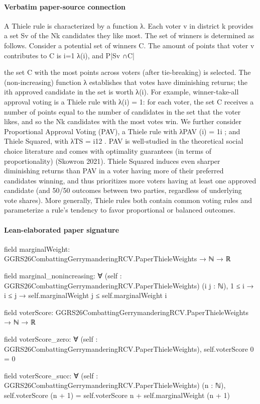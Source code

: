 \documentclass[10pt]{article}
\begin{document}
\paragraph{Verbatim paper-source connection}
\begin{ReviewVerbatim}
A Thiele rule is characterized by a function λ. Each voter v in district k provides a set Sv
of the Nk candidates they like most. The set of winners is determined as follows. Consider a
potential set of winners C. The amount of points that voter v contributes to C is i=1         λ(i), and
                                                                                     P|Sv ∩C|

the set C with the most points across voters (after tie-breaking) is selected. The (non-increasing)
function λ establishes that votes have diminishing returns; the ith approved candidate in the set is
worth λ(i). For example, winner-take-all approval voting is a Thiele rule with λ(i) = 1: for each
voter, the set C receives a number of points equal to the number of candidates in the set that the
voter likes, and so the Nk candidates with the most votes win. We further consider Proportional
Approval Voting (PAV), a Thiele rule with λPAV (i) = 1i ; and Thiele Squared, with λTS = i12 . PAV
is well-studied in the theoretical social choice literature and comes with optimality guarantees (in
terms of proportionality) (Skowron 2021). Thiele Squared induces even sharper diminishing returns
than PAV in a voter having more of their preferred candidates winning, and thus prioritizes more
voters having at least one approved candidate (and 50/50 outcomes between two parties, regardless
of underlying vote shares). More generally, Thiele rules both contain common voting rules and
parameterize a rule’s tendency to favor proportional or balanced outcomes.
\end{ReviewVerbatim}



\paragraph{Lean-elaborated paper signature}
\begin{ReviewVerbatim}
field marginalWeight:
GGRS26CombattingGerrymanderingRCV.PaperThieleWeights → ℕ → ℝ

field marginal_nonincreasing:
∀ (self : GGRS26CombattingGerrymanderingRCV.PaperThieleWeights) (i j : ℕ),
  1 ≤ i → i ≤ j → self.marginalWeight j ≤ self.marginalWeight i

field voterScore:
GGRS26CombattingGerrymanderingRCV.PaperThieleWeights → ℕ → ℝ

field voterScore_zero:
∀ (self : GGRS26CombattingGerrymanderingRCV.PaperThieleWeights), self.voterScore 0 = 0

field voterScore_succ:
∀ (self : GGRS26CombattingGerrymanderingRCV.PaperThieleWeights) (n : ℕ),
  self.voterScore (n + 1) = self.voterScore n + self.marginalWeight (n + 1)
\end{ReviewVerbatim}
\end{document}
